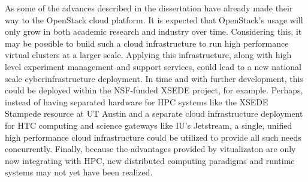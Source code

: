 As some of the advances described in the dissertation have already made their way to the OpenStack cloud platform. It is expected that OpenStack's usage will only grow in both academic research and industry over time.  Considering this, it may be possible to build such a cloud infrastructure to run high performance virtual clusters at a larger scale. Applying this infrastructure, along with high level experiment management and support services, could lead to a new national scale cyberinfrastructure deployment.  In time and with further development, this could be deployed within the NSF-funded XSEDE project, for example. Perhaps, instead of having separated hardware for HPC systems like the XSEDE Stampede resource at UT Austin and a separate cloud infrastructure deployment for HTC computing and science gateways like IU's Jetstream, a single, unified high performance cloud infrastructure could be utilized to provide all such needs concurrently.  Finally, because the advantages provided by vitualizaton are only now integrating with HPC, new distributed computing paradigms and runtime systems may not yet have been realized.   

